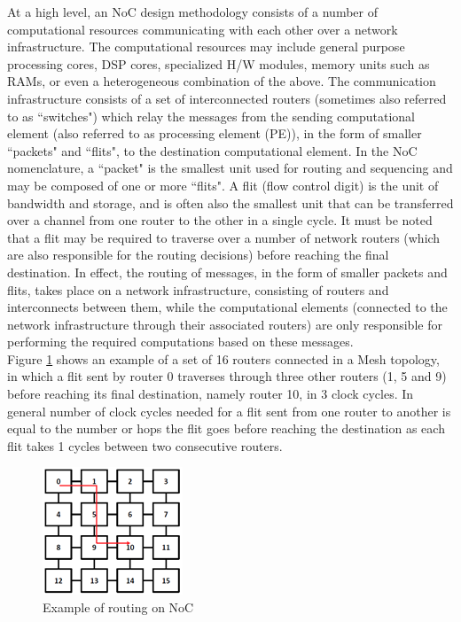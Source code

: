 At a high level, an NoC design methodology consists of a number of computational resources communicating with each other over a network infrastructure. The computational resources may include general purpose processing cores, DSP cores, specialized H/W modules, memory units such as RAMs, or even a heterogeneous combination of the above. The communication infrastructure consists of a set of interconnected routers (sometimes also referred to as ``switches") which relay the messages from the sending computational element (also referred to as processing element (PE)), in the form of smaller ``packets" and ``flits", to the destination computational element. In the NoC nomenclature, a ``packet" is the smallest unit used for routing and sequencing and may be composed of one or more ``flits". A flit (flow control digit) is the unit of bandwidth and storage, and is often also the smallest unit that can be transferred over a channel from one router to the other in a single cycle. It must be noted that a flit may be required to traverse over a number of network routers (which are also responsible for the routing decisions) before reaching the final destination. In effect, the routing of messages, in the form of smaller packets and flits, takes place on a network infrastructure, consisting of routers and interconnects between them, while the computational elements (connected to the network infrastructure through their associated routers) are only responsible for performing the required computations based on these messages. \\

Figure \ref{meshRouting} shows an example of a set of 16 routers connected in a Mesh topology, in which a flit sent by router 0 traverses through three other routers (1, 5 and 9) before reaching its final destination, namely router 10, in 3 clock cycles. In general number of clock cycles needed for a flit sent from one router to another is equal to the number or hops the flit goes before reaching the destination as each flit takes 1 cycles between two consecutive routers.

\begin{figure}[H]
	\centering
	\includegraphics[scale=1]{./figs/meshRouting}
	\caption{Example of routing on NoC}
	\label{meshRouting}
\end{figure}

